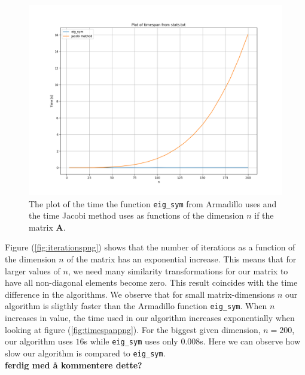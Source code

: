 \documentclass{article}
\begin{document}
  \begin{figure}
    \includegraphics[width=0.5\linewidth]{timespan-stats.png}
    \caption{The plot of the time the function \texttt{eig\_sym} from Armadillo uses and the time Jacobi method uses as functions of the dimension $n$ if the matrix \textbf{A}.}
    \label{fig:timespanpngnei}
  \end{figure}
\fi



  Figure (\ref{fig:iterationspng}) shows that the number of iterations as a function of the dimension $n$ of the matrix has an exponential increase. This means that for larger values of $n$, we need many similarity transformations for our matrix to have all non-diagonal elements become zero. This result coincides with the time difference in the algorithms. We observe that for small matrix-dimensions $n$ our algorithm is sligthly faster than the Armadillo function \texttt{eig\_sym}. When $n$ increases in value, the time used in our algorithm increases exponentially when looking at figure (\ref{fig:timespanpng}). For the biggest given dimension, $n = 200$, our algorithm uses $16$s while \texttt{eig\_sym} uses only $0.008$s. Here we can observe how slow our algorithm is compared to \texttt{eig\_sym}. \\


  \textbf{ferdig med å kommentere dette?}

\end{document}
